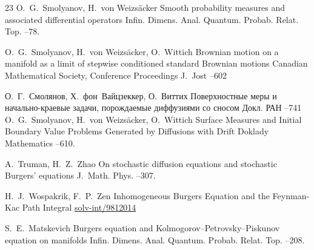 \begin{thebibliography}{23}
\by O.~G.~Smolyanov, H.~von Weizs\"{a}cker
\paper Smooth probability measures and associated differential operators
\jour  Infin. Dimens. Anal. Quantum. Probab. Relat. Top.
--78.

\by O.~G.~Smolyanov, H.~von Weizs\"{a}cker, O.~Wittich
\paper Brownian motion on a manifold as a limit of stepwise conditioned standard Brownian motions
\inbook  Canadian Mathematical Society, Conference Proceedings
\ed J.~Jost
--602


\by О.~Г.~Смолянов, Х.~фон~Вайцзеккер, О.~Виттих
\paper Поверхностные меры и начально-краевые задачи, порождаемые диффузиями со сносом
\jour Докл. РАН
--741
\transl
\by O.~G.~Smolyanov, H.~von Weizs\"{a}cker, O.~Wittich
\paper Surface Measures and Initial Boundary Value Problems Generated by Diffusions with Drift
\jour Doklady Mathematics
--610.

\by A.~Truman, H.~Z.~Zhao
\paper On stochastic diffusion equations and stochastic Burgers' equations
\jour J.~Math. Phys.
--307.



\by H.~J.~Wospakrik, F.~P.~Zen
\eprint Inhomogeneous Burgers Equation and the Feynman-Kac Path Integral
\arxiv \href{http://arxiv.org/abs/solv-int/9812014}{solv-int/9812014}

\by S.~E.~Matskevich
\paper Burgers equation and Kolmogorov--Petrovsky--Piskunov equation on manifolds
\jour  Infin. Dimens. Anal. Quantum. Probab. Relat. Top.
--208.

\end{thebibliography}





\makeentitle

\renewcommand{\baselinestretch}{0.9}


 \newpage
%
%
%

